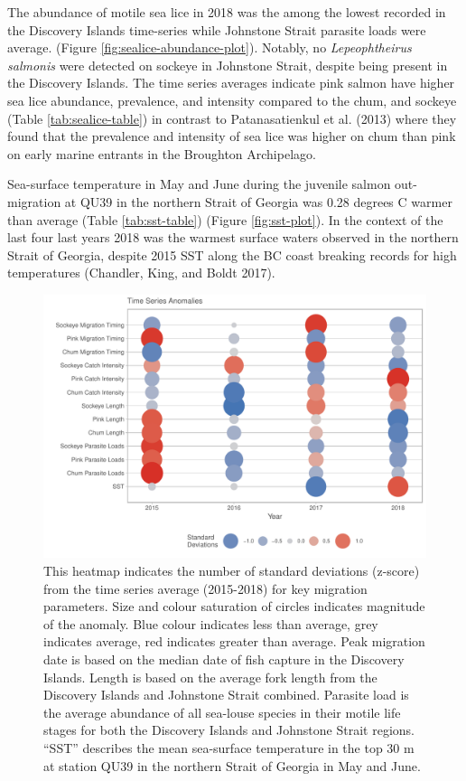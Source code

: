 \documentclass[fleqn,10pt]{wlpeerj} %
\begin{document}
The abundance of motile sea lice in 2018 was the among the lowest recorded in the Discovery Islands time-series while Johnstone Strait parasite loads were average. (Figure \ref{fig:sealice-abundance-plot}). Notably, no \emph{Lepeophtheirus salmonis} were detected on sockeye in Johnstone Strait, despite being present in the Discovery Islands. The time series averages indicate pink salmon have higher sea lice abundance, prevalence, and intensity compared to the chum, and sockeye (Table \ref{tab:sealice-table}) in contrast to Patanasatienkul et al. (2013) where they found that the prevalence and intensity of sea lice was higher on chum than pink on early marine entrants in the Broughton Archipelago.

Sea-surface temperature in May and June during the juvenile salmon out-migration at QU39 in the northern Strait of Georgia was 0.28 degrees C warmer than average (Table \ref{tab:sst-table}) (Figure \ref{fig:sst-plot}). In the context of the last four last years 2018 was the warmest surface waters observed in the northern Strait of Georgia, despite 2015 SST along the BC coast breaking records for high temperatures (Chandler, King, and Boldt 2017).

\begin{figure}[H]
\includegraphics[width=0.95\linewidth]{Migration_Observations_Report_files/figure-latex/heatmap-1} \caption{This heatmap indicates the number of standard deviations (z-score) from the time series average (2015-2018) for key migration parameters. Size and colour saturation of circles indicates magnitude of the anomaly. Blue colour indicates less than average, grey indicates average, red indicates greater than average. Peak migration date is based on the median date of fish capture in the Discovery Islands. Length is based on the average fork length from the Discovery Islands and Johnstone Strait combined. Parasite load is the average abundance of all sea-louse species in their motile life stages for both the Discovery Islands and Johnstone Strait regions. “SST” describes the mean sea-surface temperature in the top 30 m at station QU39 in the northern Strait of Georgia in May and June.}\label{fig:heatmap}
\end{figure}
\end{document}
